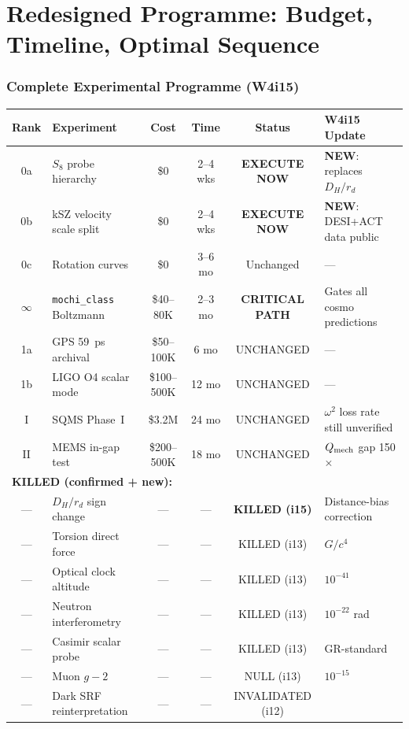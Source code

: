 \documentclass[11pt]{article}
\begin{document}
\part{Redesigned Programme: Budget, Timeline, Optimal Sequence}
\label{part:consolidated}

\section{Complete Experimental Programme (W4i15)}

\begin{center}
\renewcommand{\arraystretch}{1.3}
\begin{longtable}{@{}clcccl@{}}
\toprule
\textbf{Rank} & \textbf{Experiment} & \textbf{Cost} & \textbf{Time} &
  \textbf{Status} & \textbf{W4i15 Update} \\
\midrule
\endhead
0a & $S_8$ probe hierarchy & \$0 & 2--4 wks & \textbf{EXECUTE NOW} &
  \textbf{NEW}: replaces $D_H/r_d$ \\
0b & kSZ velocity scale split & \$0 & 2--4 wks & \textbf{EXECUTE NOW} &
  \textbf{NEW}: DESI+ACT data public \\
0c & Rotation curves & \$0 & 3--6 mo & Unchanged & --- \\
\midrule
$\infty$ & \texttt{mochi\_class} Boltzmann & \$40--80K & 2--3 mo &
  \textbf{CRITICAL PATH} & Gates all cosmo predictions \\
\midrule
1a & GPS 59~ps archival & \$50--100K & 6 mo & UNCHANGED & --- \\
1b & LIGO O4 scalar mode & \$100--500K & 12 mo & UNCHANGED & --- \\
\midrule
I & SQMS Phase~I & \$3.2M & 24 mo & UNCHANGED &
  $\omega^2$ loss rate still unverified \\
II & MEMS in-gap test & \$200--500K & 18 mo & UNCHANGED &
  $Q_{\rm mech}$ gap 150$\times$ \\
\midrule
\multicolumn{6}{l}{\textbf{KILLED (confirmed + new):}} \\
--- & $D_H/r_d$ sign change & --- & --- & \textbf{KILLED (i15)} &
  Distance-bias correction \\
--- & Torsion direct force & --- & --- & KILLED (i13) & $G/c^4$ \\
--- & Optical clock altitude & --- & --- & KILLED (i13) & $10^{-41}$ \\
--- & Neutron interferometry & --- & --- & KILLED (i13) & $10^{-22}$ rad \\
--- & Casimir scalar probe & --- & --- & KILLED (i13) & GR-standard \\
--- & Muon $g{-}2$ & --- & --- & NULL (i13) & $10^{-15}$ \\
--- & Dark SRF reinterpretation & --- & --- & INVALIDATED (i12) & \\
\bottomrule
\end{longtable}
\end{center}
\end{document}
